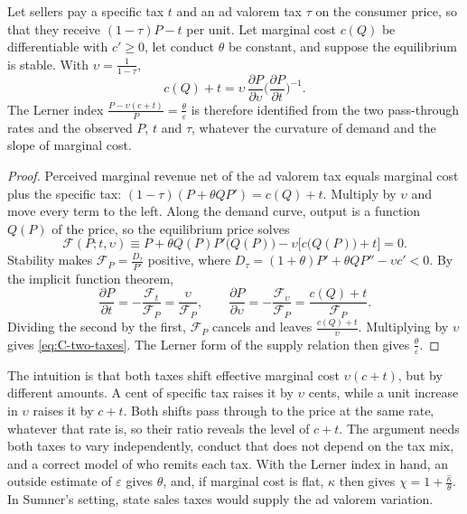 \begin{proposition}\label{prop:C-two-taxes}
Let sellers pay a specific tax $t$ and an ad valorem tax $\tau$ on the consumer price, so that they receive
$(1 - \tau)P - t$ per unit. Let marginal cost $c(Q)$ be differentiable with $c' \ge 0$, let conduct $\theta$ be
constant, and suppose the equilibrium is stable. With $\upsilon = \frac{1}{1 - \tau}$,
\begin{equation}\label{eq:C-two-taxes}
c(Q) + t = \upsilon\,\frac{\partial P}{\partial\upsilon}\Big(\frac{\partial P}{\partial t}\Big)^{-1} .
\end{equation}
The Lerner index $\frac{P - \upsilon(c + t)}{P} = \frac{\theta}{\varepsilon}$ is therefore identified from the two
pass-through rates and the observed $P$, $t$ and $\tau$, whatever the curvature of demand and the slope of marginal
cost.
\end{proposition}

\begin{proof}
Perceived marginal revenue net of the ad valorem tax equals marginal cost plus the specific tax:
$(1 - \tau)(P + \theta QP') = c(Q) + t$. Multiply by $\upsilon$ and move every term to the left. Along the demand
curve, output is a function $Q(P)$ of the price, so the equilibrium price solves
\begin{equation*}
\mathcal{F}(P; t, \upsilon) \equiv P + \theta Q(P)P'\big(Q(P)\big) - \upsilon\big[c\big(Q(P)\big) + t\big] = 0 .
\end{equation*}
Stability makes $\mathcal{F}_P = \frac{D_\tau}{P'}$ positive, where
$D_\tau = (1 + \theta)P' + \theta QP'' - \upsilon c' < 0$. By the implicit function theorem,
\begin{equation*}
\frac{\partial P}{\partial t} = -\frac{\mathcal{F}_t}{\mathcal{F}_P} = \frac{\upsilon}{\mathcal{F}_P} ,
\qquad
\frac{\partial P}{\partial\upsilon} = -\frac{\mathcal{F}_{\upsilon}}{\mathcal{F}_P} = \frac{c(Q) + t}{\mathcal{F}_P} .
\end{equation*}
Dividing the second by the first, $\mathcal{F}_P$ cancels and leaves $\frac{c(Q) + t}{\upsilon}$. Multiplying by $\upsilon$ gives
\eqref{eq:C-two-taxes}. The Lerner form of the supply relation then gives $\frac{\theta}{\varepsilon}$.
\end{proof}

The intuition is that both taxes shift effective marginal cost $\upsilon(c + t)$, but by different amounts. A cent of
specific tax raises it by $\upsilon$ cents, while a unit increase in $\upsilon$ raises it by $c + t$. Both shifts pass
through to the price at the same rate, whatever that rate is, so their ratio reveals the level of $c + t$. The
argument needs both taxes to vary independently, conduct that does not depend on the tax mix, and a correct model of
who remits each tax. With the Lerner index in hand, an outside estimate of $\varepsilon$ gives $\theta$, and, if
marginal cost is flat, $\hat\kappa$ then gives $\chi = 1 + \frac{\hat\kappa}{\theta}$. In Sumner's setting, state sales taxes would supply the
ad valorem variation.

